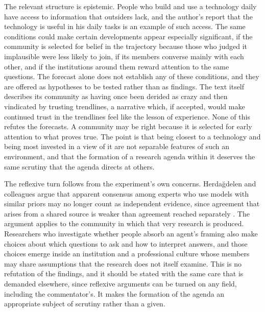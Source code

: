 \documentclass[11pt]{article}
\begin{document}
The relevant structure is epistemic. People who build and use a technology daily have access to information that outsiders lack, and the author's report that the technology is useful in his daily tasks is an example of such access. The same conditions could make certain developments appear especially significant, if the community is selected for belief in the trajectory because those who judged it implausible were less likely to join, if its members converse mainly with each other, and if the institutions around them reward attention to the same questions. The forecast alone does not establish any of these conditions, and they are offered as hypotheses to be tested rather than as findings. The text itself describes its community as having once been derided as crazy and then vindicated by trusting trendlines, a narrative which, if accepted, would make continued trust in the trendlines feel like the lesson of experience. None of this refutes the forecasts. A community may be right because it is selected for early attention to what proves true. The point is that being closest to a technology and being most invested in a view of it are not separable features of such an environment, and that the formation of a research agenda within it deserves the same scrutiny that the agenda directs at others.

The reflexive turn follows from the experiment's own concerns. Herdağdelen and colleagues argue that apparent consensus among experts who use models with similar priors may no longer count as independent evidence, since agreement that arises from a shared source is weaker than agreement reached separately \cite{herdagdelen}. The argument applies to the community in which that very research is produced. Researchers who investigate whether people absorb an agent's framing also make choices about which questions to ask and how to interpret answers, and those choices emerge inside an institution and a professional culture whose members may share assumptions that the research does not itself examine. This is no refutation of the findings, and it should be stated with the same care that is demanded elsewhere, since reflexive arguments can be turned on any field, including the commentator's. It makes the formation of the agenda an appropriate subject of scrutiny rather than a given.
\end{document}
